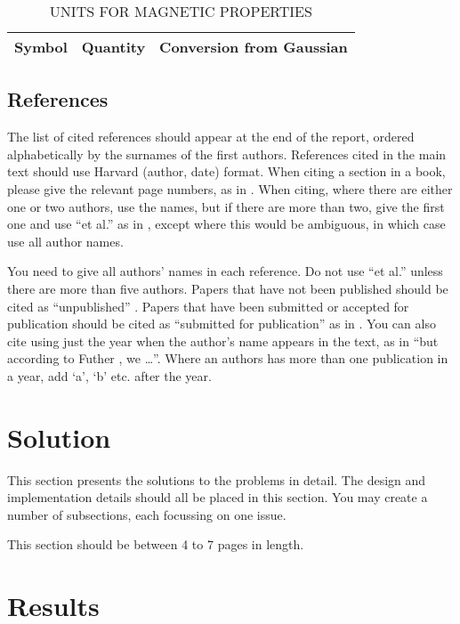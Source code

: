 \documentclass[12pt,a4paper]{article}
\begin{document}
\begin{table}[htb]
\centering
\caption{UNITS FOR MAGNETIC PROPERTIES}
\vspace*{6pt}
\label{units}
\begin{tabular}{ccc}\hline\hline
Symbol & Quantity & Conversion from Gaussian \\ \hline
\end{tabular}
\end{table}

\subsection{References}

The list of cited references should appear at the end of the report, ordered alphabetically by the surnames of the first authors.  References cited in the main text should use Harvard (author, date) format.  When citing a section in a book, please give the relevant page numbers, as in \cite[p293]{budgen}.  When citing, where there are either one or two authors, use the names, but if there are more than two, give the first one and use ``et al.'' as in  , except where this would be ambiguous, in which case use all author names.

You need to give all authors' names in each reference.  Do not use ``et al.'' unless there are more than five authors.  Papers that have not been published should be cited as ``unpublished'' \cite{euther}.  Papers that have been submitted or accepted for publication should be cited as ``submitted for publication'' as in \cite{futher} .  You can also cite using just the year when the author's name appears in the text, as in ``but according to Futher \citeyear{futher}, we \dots''.  Where an authors has more than one publication in a year, add `a', `b' etc. after the year.

\section{Solution}

This section presents the solutions to the problems in detail.  The design and implementation details should all be placed in this section.  You may create a number of subsections, each focussing on one issue.  

This section should be between 4 to 7 pages in length.

\section{Results}
\end{document}
